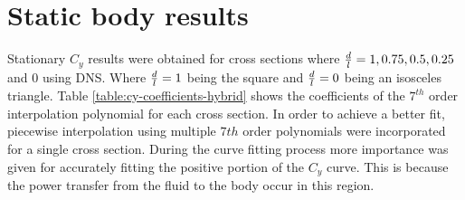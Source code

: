 \section{Static body results}
\label{sec:cross-sec-Static body results}


Stationary $C_y$ results were obtained for cross sections where $\frac{d}{l}=1,0.75,0.5,0.25$ and $0$ using DNS. Where $\frac{d}{l}=1$ being the square and $\frac{d}{l}=0$ being an isosceles  triangle. Table \ref{table:cy-coefficients-hybrid} shows the coefficients of the $7^{th}$ order interpolation polynomial for each cross section. In order to achieve a better fit, piecewise interpolation using multiple $7th$ order polynomials were incorporated for a single cross section. During the curve fitting process more importance was given for accurately fitting  the positive portion of the $C_{y}$ curve. This is because the power transfer from the fluid to the body occur in this region. 

 


